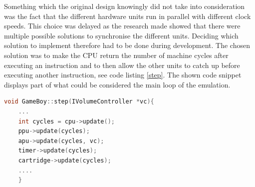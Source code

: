 


Something which the original design knowingly did not take into consideration was the fact that the different hardware units run in parallel with different clock speeds. This choice was delayed as the research made showed that there were multiple possible solutions to synchronise the different units. Deciding which solution to implement therefore had to be done during development. The chosen solution was to make the CPU return the number of machine cycles after executing an instruction and to then allow the other units to catch up before executing another instruction, see code listing \ref{step}. The shown code snippet displays part of what could be considered the main loop of the emulation. 
\begin{lstlisting}[language=C++,
caption = {Code displaying how the CPU executes an instruction and returns the number of machine cycles, whereafter the other units catch up by executing the same number of cycles.},
label = {step}]
void GameBoy::step(IVolumeController *vc){
    ...
    int cycles = cpu->update();
    ppu->update(cycles);
    apu->update(cycles, vc);
    timer->update(cycles);
    cartridge->update(cycles);
    ....
    }
\end{lstlisting}


